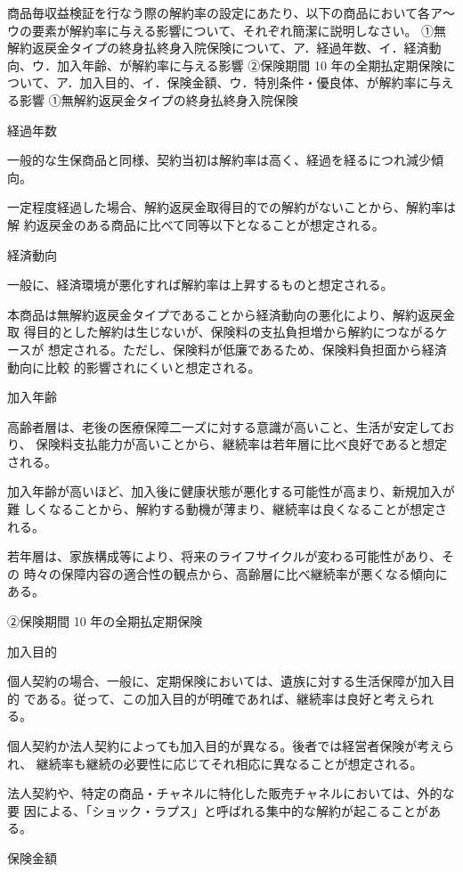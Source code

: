 \documentclass[report,gutter=10mm,fore-edge=10mm,uplatex,dvipdfmx]{jlreq}
\begin{document}
商品毎収益検証を行なう際の解約率の設定にあたり、以下の商品において各ア～ウの要素が解約率に与える影響について、それぞれ簡潔に説明しなさい。
①無解約返戻金タイプの終身払終身入院保険について、ア．経過年数、イ．経済動向、ウ．加入年齢、が解約率に与える影響
②保険期間 10 年の全期払定期保険について、ア．加入目的、イ．保険金額、ウ．特別条件・優良体、が解約率に与える影響
\answer{}
①無解約返戻金タイプの終身払終身入院保険

経過年数

一般的な生保商品と同様、契約当初は解約率は高く、経過を経るにつれ減少傾向。

一定程度経過した場合、解約返戻金取得目的での解約がないことから、解約率は解
約返戻金のある商品に比べて同等以下となることが想定される。

経済動向

一般に、経済環境が悪化すれば解約率は上昇するものと想定される。

本商品は無解約返戻金タイプであることから経済動向の悪化により、解約返戻金取
得目的とした解約は生じないが、保険料の支払負担増から解約につながるケースが
想定される。ただし、保険料が低廉であるため、保険料負担面から経済動向に比較
的影響されにくいと想定される。

加入年齢

高齢者層は、老後の医療保障二一ズに対する意識が高いこと、生活が安定しており、
保険料支払能力が高いことから、継続率は若年層に比べ良好であると想定される。

加入年齢が高いほど、加入後に健康状態が悪化する可能性が高まり、新規加入が難
しくなることから、解約する動機が薄まり、継続率は良くなることが想定される。

若年層は、家族構成等により、将来のライフサイクルが変わる可能性があり、その
時々の保障内容の適合性の観点から、高齢層に比べ継続率が悪くなる傾向にある。

②保険期間 10 年の全期払定期保険

加入目的

個人契約の場合、一般に、定期保険においては、遺族に対する生活保障が加入目的
である。従って、この加入目的が明確であれば、継続率は良好と考えられる。

個人契約か法人契約によっても加入目的が異なる。後者では経営者保険が考えられ、
継続率も継続の必要性に応じてそれ相応に異なることが想定される。

法人契約や、特定の商品・チャネルに特化した販売チャネルにおいては、外的な要
因による、「ショック・ラプス」と呼ばれる集中的な解約が起こることがある。

保険金額
\end{document}

